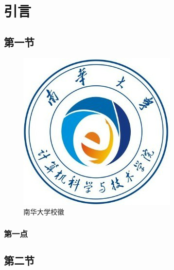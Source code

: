 \section{引言}
\subsection{第一节}
\begin{figure}
	\centering
	\includegraphics{./Pictures/usc.png}	
	\caption{南华大学校徽}	
\end{figure}


\subsubsection{第一点}
\subsection{第二节}